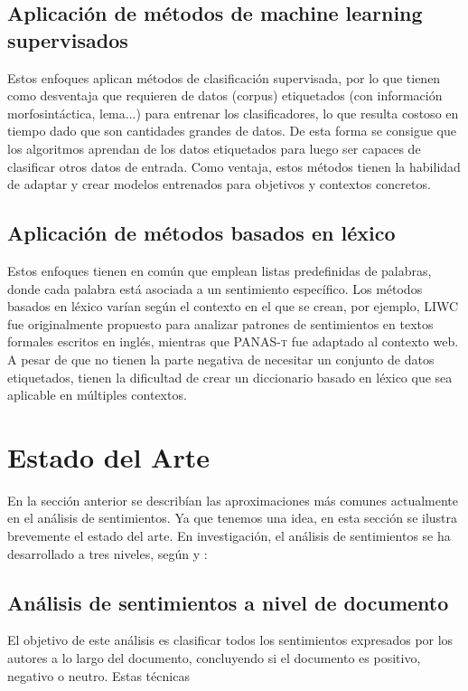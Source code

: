 \subsection{Aplicación de métodos de machine learning supervisados}
Estos enfoques aplican métodos de clasificación supervisada, por lo que tienen como desventaja que requieren de datos (corpus) etiquetados (con información morfosintáctica, lema...) para entrenar los clasificadores, lo que resulta costoso en tiempo dado que son cantidades grandes de datos.\newline
De esta forma se consigue que los algoritmos aprendan de los datos etiquetados para luego ser capaces de clasificar otros datos de entrada. Como ventaja, estos métodos tienen la habilidad de adaptar y crear modelos entrenados para objetivos y contextos concretos.  
\subsection{Aplicación de métodos basados en léxico}
Estos enfoques tienen en común que emplean listas predefinidas de palabras, donde cada palabra está asociada a un sentimiento específico. Los métodos basados en léxico varían según el contexto en el que se crean, por ejemplo, \textsc{LIWC} \citet{tausczik2010psychological} fue originalmente propuesto para analizar patrones de sentimientos en textos formales escritos en inglés, mientras que \textsc{PANAS-t} \citet{gonccalves2013panas} fue adaptado al contexto web.\newline
A pesar de que no tienen la parte negativa de necesitar un conjunto de datos etiquetados, tienen la dificultad de crear un diccionario basado en léxico que sea aplicable en múltiples contextos. 
\section{Estado del Arte}
En la sección anterior se describían las aproximaciones más comunes actualmente en el análisis de sentimientos. Ya que tenemos una idea, en esta sección se ilustra brevemente el estado del arte.\newline
En investigación, el análisis de sentimientos se ha desarrollado a tres niveles, según  \citet{9781107017894} y \citet{westerski2007sentiment} :
\subsection{Análisis de sentimientos a nivel de documento}
El objetivo de este análisis es clasificar todos los sentimientos expresados por los autores a lo largo del documento, concluyendo si el documento es positivo, negativo o neutro. Estas técnicas 





